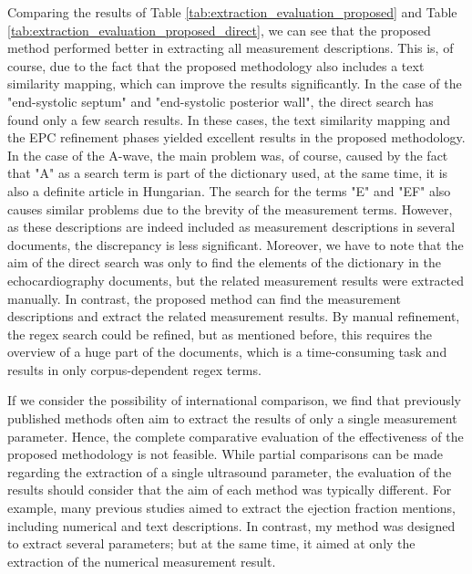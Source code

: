 Comparing the results of Table \ref{tab:extraction_evaluation_proposed} and Table \ref{tab:extraction_evaluation_proposed_direct}, we can see that the proposed method performed better in extracting all measurement descriptions. This is, of course, due to the fact that the proposed methodology also includes a text similarity mapping, which can improve the results significantly. In the case of the "end-systolic septum" and "end-systolic posterior wall", the direct search has found only a few search results. In these cases, the text similarity mapping and the EPC refinement phases yielded excellent results in the proposed methodology. In the case of the A-wave, the main problem was, of course, caused by the fact that "A" as a search term is part of the dictionary used, at the same time, it is also a definite article in Hungarian. The search for the terms "E" and "EF" also causes similar problems due to the brevity of the measurement terms. However, as these descriptions are indeed included as measurement descriptions in several documents, the discrepancy is less significant. Moreover, we have to note that the aim of the direct search was only to find the elements of the dictionary in the echocardiography documents, but the related measurement results were extracted manually. In contrast, the proposed method can find the measurement descriptions and extract the related measurement results. By manual refinement, the regex search could be refined, but as mentioned before, this requires the overview of a huge part of the documents, which is a time-consuming task and results in only corpus-dependent regex terms. 

\vspace{0.5cm}

If we consider the possibility of international comparison, we find that previously published methods often aim to extract the results of only a single measurement parameter. Hence, the complete comparative evaluation of the effectiveness of the proposed methodology is not feasible. While partial comparisons can be made regarding the extraction of a single ultrasound parameter, the evaluation of the results should consider that the aim of each method was typically different. For example, many previous studies aimed to extract the ejection fraction mentions, including numerical and text descriptions. In contrast, my method was designed to extract several parameters; but at the same time, it aimed at only the extraction of the numerical measurement result. 

